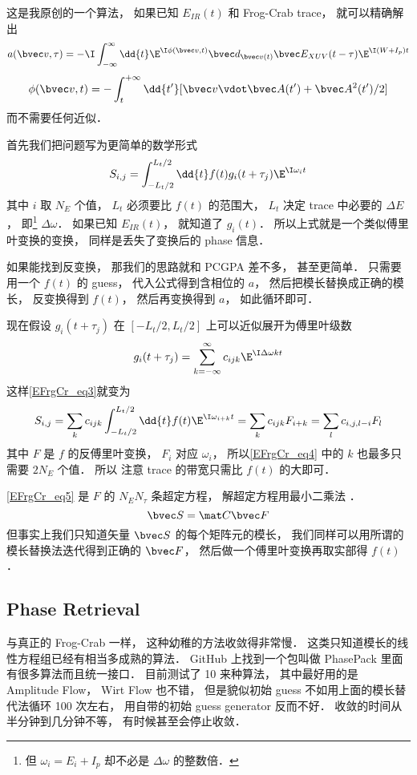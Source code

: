 
这是我原创的一个算法， 如果已知 $E_{IR}(t)$ 和 Frog-Crab trace， 就可以精确解出
\begin{equation}
a(\bvec v, \tau) = -\I\int_{-\infty}^{\infty} \dd{t} \E^{\I\phi(\bvec v, t)} \bvec d_{\bvec v(t)} \bvec E_{XUV}(t-\tau) \E^{\I(W+I_p)t}
\end{equation}
\begin{equation}
\phi(\bvec v, t) = -\int_t^{+\infty} \dd{t'} [\bvec v\vdot \bvec A(t') + \bvec A^2(t')/2]
\end{equation}
而不需要任何近似．

首先我们把问题写为更简单的数学形式
\begin{equation}\label{EFrgCr_eq3}
S_{i, j} = \int_{-L_t/2}^{L_t/2} \dd{t} f(t) g_i(t+\tau_j)\E^{\I\omega_i t}
\end{equation}
其中 $i$ 取 $N_E$ 个值， $L_t$ 必须要比 $f(t)$ 的范围大， $L_t$ 决定 trace 中必要的 $\Delta E$， 即\footnote{但 $\omega_i = E_i + I_p$ 却不必是 $\Delta \omega$ 的整数倍．} $\Delta \omega$． 如果已知 $E_{IR}(t)$， 就知道了 $g_i(t)$． 所以上式就是一个类似傅里叶变换的变换， 同样是丢失了变换后的 phase 信息．

如果能找到反变换， 那我们的思路就和 PCGPA 差不多， 甚至更简单． 只需要用一个 $f(t)$ 的 guess， 代入公式得到含相位的 $a$， 然后把模长替换成正确的模长， 反变换得到 $f(t)$， 然后再变换得到 $a$， 如此循环即可．

现在假设 $g_i(t + \tau_j)$ 在 $[-L_t/2, L_t/2]$ 上可以近似展开为傅里叶级数
\begin{equation}\label{EFrgCr_eq4}
g_i(t + \tau_j) = \sum_{k=-\infty}^{\infty} c_{ijk} \E^{\I \Delta \omega kt}
\end{equation}
这样\autoref{EFrgCr_eq3}就变为
\begin{equation}\label{EFrgCr_eq5}
S_{i, j} = \sum_k c_{ijk} \int_{-L_t/2}^{L_t/2} \dd{t} f(t) \E^{\I \omega_{i+k} t}
= \sum_k c_{ijk} F_{i+k} = \sum_l c_{i,j,l-i} F_l
\end{equation}
其中 $F$ 是 $f$ 的反傅里叶变换， $F_i$ 对应 $\omega_i$， 所以\autoref{EFrgCr_eq4} 中的 $k$ 也最多只需要 $2N_E$ 个值． 所以 注意 trace 的带宽只需比 $f(t)$ 的大即可．

\autoref{EFrgCr_eq5} 是 $F$ 的 $N_E N_\tau$ 条超定方程， 解超定方程用最小二乘法%
．
\begin{equation}
\bvec S = \mat C \bvec F
\end{equation}
但事实上我们只知道矢量 $\bvec S$ 的每个矩阵元的模长， 我们同样可以用所谓的模长替换法迭代得到正确的 $\bvec F$， 然后做一个傅里叶变换再取实部得 $f(t)$．

\subsection{Phase Retrieval}
与真正的 Frog-Crab 一样， 这种幼稚的方法收敛得非常慢． 这类只知道模长的线性方程组已经有相当多成熟的算法． GitHub 上找到一个包叫做 PhasePack 里面有很多算法而且统一接口． 目前测试了 10 来种算法， 其中最好用的是 Amplitude Flow， Wirt Flow 也不错， 但是貌似初始 guess 不如用上面的模长替代法循环 100 次左右， 用自带的初始 guess generator 反而不好． 收敛的时间从半分钟到几分钟不等， 有时候甚至会停止收敛．
